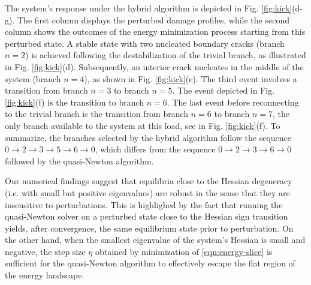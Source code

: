 \documentclass[10pt]{article}
\begin{document}
The system's response under the hybrid algorithm is depicted in Fig. \ref{fig:kick}(d-g). The first column displays the perturbed damage profiles, while the second column shows the outcomes of the energy minimization process starting from  this perturbed state. A stable state with two nucleated boundary cracks (branch \( n=2 \)) is achieved following the destabilization of the trivial branch, as illustrated in Fig. \ref{fig:kick}(d). Subsequently, an interior crack nucleates in the middle of the system (branch \( n=4 \)), as shown in Fig. \ref{fig:kick}(e). The third event involves a transition from branch \( n=3 \) to branch \( n=5 \). The  event depicted in Fig. \ref{fig:kick}(f) is the transition to branch \( n=6 \). The last event before reconnecting to the trivial branch is the transition from branch \( n=6 \) to branch \( n=7 \), the only  branch available to the system at this load, see in Fig. \ref{fig:kick}(f). To summarize, the branches selected by the hybrid algorithm follow the sequence 
\( 0 \rightarrow 2 \rightarrow 3 \rightarrow 5 \rightarrow 6 \rightarrow 0 \), 
which differs from the sequence 
\( 0 \rightarrow 2 \rightarrow 3 \rightarrow 6 \rightarrow 0 \) 
followed by the quasi-Newton algorithm.

Our numerical findings suggest that equilibria close to the Hessian degeneracy (i.e. with small but positive eigenvalues) are robust in the sense that they are insensitive to perturbations. This is highlighed by the fact that running the quasi-Newton solver on a perturbed state close to the Hessian sign transition yields, after convergence, the same equilibrium state prior to perturbation.
On the other hand, when the smallest eigenvalue of the system's Hessian is small and negative, the step size \( \eta \) obtained by minimization of \eqref{eqn:energy-slice} is sufficient for the quasi-Newton algorithm to effectively escape the flat region of the energy landscape. 

%
\end{document}
